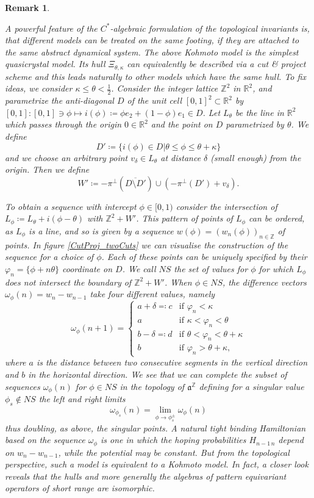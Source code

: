 \documentclass[11pt]{amsart}
\newtheorem*{remark}{Remark}
\newcommand{\R}{\mathbb{R}}
\newcommand{\Z}{\mathbb{Z}}
\newcommand{\cut}{\kappa}
\begin{document}
\begin{remark}\label{cutandproject_remark}{\rmfamily
A powerful feature of the $C^*$-algebraic formulation of the topological invariants is, that different models can be treated on the same footing, if they are attached to the same abstract dynamical system. The above Kohmoto model is the simplest quasicrystal model.
Its hull $\Xi_{\theta, \cut}$ can equivalently be described via a cut \& project scheme and this leads naturally to other models which have the same hull. To fix ideas, we consider $\cut\le\theta<\frac{1}{2}$. Consider the integer lattice $\Z^2$ in $\R^2$, and parametrize the anti-diagonal $D$ of the unit cell $[0, 1]^2\subset \R^2$ by $[0, 1]: [0, 1]\ni\phi \mapsto i(\phi) \coloneqq \phi e_2 + (1 -\phi)e_1 \in D$. Let $L_\theta$ be the line in $\R^2$ which passes through the origin $0 \in\R^2$ and the point on $D$ parametrized by $\theta$. We define
		$$D'\coloneqq\{i(\phi)\in D|\theta\le\phi\le\theta+\cut\}$$
		and we choose an arbitrary point $v_\delta\in L_\theta$  at distance $\delta$ (small enough) from the origin. Then we define
		$$W'\coloneqq -\pi^\perp (\overline{D\setminus D'})\cup (-\pi^\perp (D')+v_\delta).$$
		
		To obtain a sequence with intercept $\phi \in [0, 1)$ consider the intersection of $L_\phi\coloneqq L_\theta+ i(\phi-\theta)$ with $\Z^2 + W'$. This pattern of points of $L_\phi$ can be ordered, as $L_\phi$ is a line, and so is given by a sequence $w(\phi) = (w_n (\phi))_{n\in\Z}$ of points. In figure \ref{CutProj_twoCuts} we can visualise the construction of the sequence for a choice of $\phi$. Each of these points can be uniquely specified by their $\varphi_n=\{\phi+n\theta\}$ coordinate on $D$. We call $NS$ the set of values for $\phi$ for which $L_\phi$ does not intersect the boundary of $\Z^2+W'$. When $\phi\in NS$, the difference vectors $\omega_\phi(n)=w_n - w_{ n-1}$ take four different values, namely
		$$\omega_\phi(n+1)=\left\{
		\begin{array}{llll}
			a+\delta\eqqcolon c & \mbox{if } \varphi_n<\cut\\
			a & \mbox{if } \cut<\varphi_n<\theta\\
			b-\delta\eqqcolon d & \mbox{if } \theta<\varphi_n<\theta+\cut\\
			b & \mbox{if } \varphi_n>\theta+\cut, 
		\end{array} \right.$$
		where $a$ is the distance between two consecutive segments in the vertical direction and $b$ in the horizontal direction.  
		We see that we can complete the subset of sequences $\omega_\phi(n)$ for $\phi\in NS$ in the topology of $\mathfrak{a} ^\Z$ defining for a singular value $\phi_s\notin NS$ the left and right limits
		$$\omega_{\phi_s}(n)=\lim_{\phi\rightarrow \phi_s^\pm}\omega_\phi(n)$$
		thus doubling, as above, the singular points. A natural tight binding Hamiltonian based on the sequence $\omega_\phi$ is one in which the hoping probabilities $H_{n\!-\!1\, n}$ depend on $w_n - w_{ n-1}$, while the potential may be constant. But from the topological perspective, such a model is equivalent to a Kohmoto model. In fact, a closer look reveals that the hulls and more generally the algebras of pattern equivariant operators of short range are isomorphic.
		
}
\end{remark}
\end{document}
